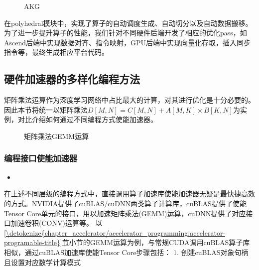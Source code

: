 \documentclass[letterpaper,10pt,english]{sphinxmanual}
\let\sphinxpxdimen\pdfpxdimen\else\newdimen\sphinxpxdimen
\begin{document}
\begin{figure}[H]
\centering
\capstart

\noindent\sphinxincludegraphics[width=800\sphinxpxdimen]{{akg}.png}
\caption{AKG}\label{\detokenize{chapter_accelerator/accelerator_programming:id21}}\label{\detokenize{chapter_accelerator/accelerator_programming:akg}}\end{figure}

\sphinxAtStartPar
在polyhedral模块中，实现了算子的自动调度生成、自动切分以及自动数据搬移。为了进一步提升算子的性能，我们针对不同硬件后端开发了相应的优化pass，如Ascend后端中实现数据对齐、指令映射，GPU后端中实现向量化存取，插入同步指令等，最终生成相应平台代码。


\subsection{硬件加速器的多样化编程方法}
\label{\detokenize{chapter_accelerator/accelerator_programming:diversified-programming-title}}\label{\detokenize{chapter_accelerator/accelerator_programming:id13}}
\sphinxAtStartPar
矩阵乘法运算作为深度学习网络中占比最大的计算，对其进行优化是十分必要的。因此本节将统一以矩阵乘法\(D[M, N] = C[M, N] + A[M, K] \times B[K, N]\)为实例，对比介绍如何通过不同编程方式使能加速器。

\begin{figure}[H]
\centering
\capstart

\noindent\sphinxincludegraphics[width=800\sphinxpxdimen]{{gemm}.svg}
\caption{矩阵乘法GEMM运算}\label{\detokenize{chapter_accelerator/accelerator_programming:id22}}\label{\detokenize{chapter_accelerator/accelerator_programming:id14}}\label{\detokenize{chapter_accelerator/accelerator_programming:gemm-algorith}}\end{figure}


\subsubsection{编程接口使能加速器}
\label{\detokenize{chapter_accelerator/accelerator_programming:id15}}\begin{itemize}
\item {} 
\sphinxAtStartPar
{}

\end{itemize}

\sphinxAtStartPar
在上述不同层级的编程方式中，直接调用算子加速库使能加速器无疑是最快捷高效的方式。NVIDIA提供了cuBLAS/cuDNN两类算子计算库，cuBLAS提供了使能Tensor
Core单元的接口，用以加速矩阵乘法(GEMM)运算，cuDNN提供了对应接口加速卷积(CONV)运算等。
以
\hyperref[\detokenize{chapter_accelerator/accelerator_programming:accelerator-programable-title}]{\ref{\detokenize{chapter_accelerator/accelerator_programming:accelerator-programable-title}}节}小节的GEMM运算为例，与常规CUDA调用cuBLAS算子库相似，通过cuBLAS加速库使能Tensor
Core步骤包括： 1. 创建cuBLAS对象句柄且设置对应数学计算模式
\end{document}
